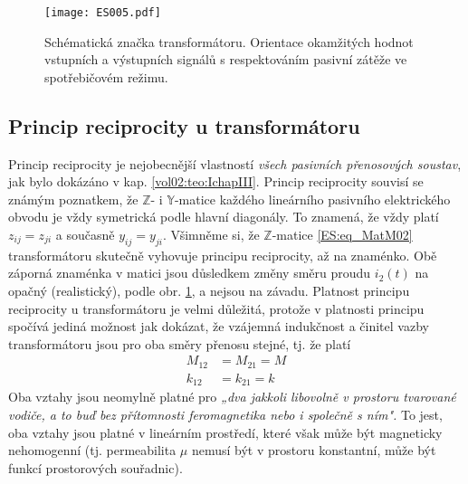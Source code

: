       \begin{figure}[ht!] %
        \centering
        \texttt{[image: ES005.pdf]}
        \caption{Schématická značka transformátoru. Orientace okamžitých hodnot vstupních a  
                 výstupních signálů s respektováním pasivní zátěže ve spotřebičovém režimu.}
        \label{ES:fig_005}
      \end{figure}

    \subsection{Princip reciprocity u transformátoru}
      Princip reciprocity je nejobecnější vlastností \emph{všech pasivních přenosových soustav}, 
      jak bylo dokázáno v kap. \ref{vol02:teo:IchapIII}. Princip reciprocity souvisí se známým 
      poznatkem, že \(\mathbb{Z}\)- i \(\mathbb{Y}\)-matice každého lineárního pasivního 
      elektrického obvodu je vždy symetrická podle hlavní diagonály. To znamená, že vždy platí 
      \(z_{ij} = z_{ji}\) a současně \(y_{ij} = y_{ji}\). Všimněme si, že \(\mathbb{Z}\)-matice 
      \ref{ES:eq_MatM02} transformátoru skutečně vyhovuje principu reciprocity, až na znaménko. Obě 
      záporná znaménka v matici jsou důsledkem změny směru proudu \(i_2(t)\) na opačný 
      (realistický), podle obr. \ref{ES:fig_005}, a nejsou na závadu. Platnost principu reciprocity 
      u transformátoru je velmi důležitá, protože v platnosti principu spočívá jediná možnost jak 
      dokázat, že vzájemná indukčnost a činitel vazby transformátoru jsou pro oba směry 
      přenosu stejné, tj. že platí
      \begin{subequations}
        \begin{align}
          M_{12} &= M_{21} = M  \label{teo:eq000a}\\
          k_{12} &= k_{21} = k  \label{teo:eq000b}
        \end{align}
      \end{subequations}
      Oba vztahy jsou neomylně platné pro \emph{„dva jakkoli libovolně v prostoru tvarované vodiče, 
      a to buď bez přítomnosti feromagnetika nebo i společně s ním".} To jest, oba vztahy jsou 
      platné v lineárním prostředí, které však může být magneticky nehomogenní (tj. permeabilita 
      \(\mu\) nemusí být v prostoru konstantní, může být funkcí prostorových souřadnic).
    
